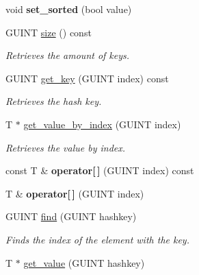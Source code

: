 \begin{DoxyCompactItemize}
void {\bfseries set\+\_\+sorted} (bool value)
\item 
\mbox{\label{classgim__hash__table_a77994868ac8519736e69c93c1c989dde}} 
G\+U\+I\+NT \hyperlink{classgim__hash__table_a77994868ac8519736e69c93c1c989dde}{size} () const
\begin{DoxyCompactList}\small\item\em Retrieves the amount of keys. \end{DoxyCompactList}\item 
\mbox{\label{classgim__hash__table_aa9f8b2ae1ac505ed5dfe73b83510dad0}} 
G\+U\+I\+NT \hyperlink{classgim__hash__table_aa9f8b2ae1ac505ed5dfe73b83510dad0}{get\+\_\+key} (G\+U\+I\+NT index) const
\begin{DoxyCompactList}\small\item\em Retrieves the hash key. \end{DoxyCompactList}\item 
\mbox{\label{classgim__hash__table_ab5ec54c3096e790e8c7ae570300df95d}} 
T $\ast$ \hyperlink{classgim__hash__table_ab5ec54c3096e790e8c7ae570300df95d}{get\+\_\+value\+\_\+by\+\_\+index} (G\+U\+I\+NT index)
\begin{DoxyCompactList}\small\item\em Retrieves the value by index. \end{DoxyCompactList}\item 
\mbox{\label{classgim__hash__table_a8462bb3aa6342465fc54659648f8c8c9}} 
const T \& {\bfseries operator\mbox{[}$\,$\mbox{]}} (G\+U\+I\+NT index) const
\item 
\mbox{\label{classgim__hash__table_a0df819cc9b510d933132f2e5d5f87488}} 
T \& {\bfseries operator\mbox{[}$\,$\mbox{]}} (G\+U\+I\+NT index)
\item 
G\+U\+I\+NT \hyperlink{classgim__hash__table_a14261b2d7de34188f8bc5179e4d60760}{find} (G\+U\+I\+NT hashkey)
\begin{DoxyCompactList}\small\item\em Finds the index of the element with the key. \end{DoxyCompactList}\item 
T $\ast$ \hyperlink{classgim__hash__table_a40b5c46a0117da3948cd1b093f185321}{get\+\_\+value} (G\+U\+I\+NT hashkey)

\end{DoxyCompactItemize}
